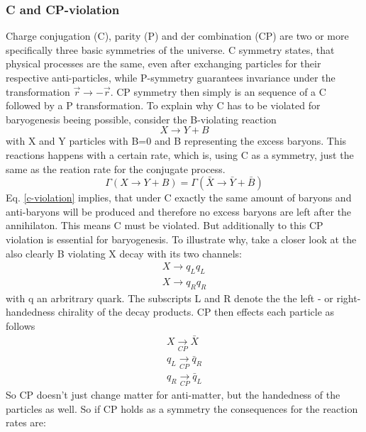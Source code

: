 \subsubsection{C and CP-violation}
Charge conjugation (C), parity (P) and der combination (CP) are two or more specifically three basic symmetries of the universe. C symmetry states, that physical processes are the same, even after exchanging particles for their respective anti-particles, while P-symmetry guarantees invariance under the transformation $\vec{r}\rightarrow-\vec{r}$. CP symmetry then simply is an sequence of a C followed by a P transformation. \newline
To explain why C has to be violated for baryogenesis beeing possible, consider the B-violating reaction
\begin{equation*}
	X\rightarrow Y+B
\end{equation*}
with X and Y particles with B=0 and B representing the excess baryons. This reactions happens with a certain rate, which is, using C as a symmetry, just the same as the reation rate for the conjugate process.
\begin{equation}
	\Gamma(X\rightarrow Y+B)=\Gamma(\bar{X}\rightarrow \bar{Y}+\bar{B})
	\label{c-violation}
\end{equation}
Eq. \ref{c-violation} implies, that under C exactly the same amount of baryons and anti-baryons will be produced and therefore no excess baryons are left after the annihilaton. This means C must be violated. \newline
But additionally to this CP violation is essential for baryogenesis. To illustrate why, take a closer look at the also clearly B  violating X decay with its two channels:
\begin{align*}
	X\rightarrow q_Lq_L\\
	X\rightarrow q_Rq_R
\end{align*}
with q an arbritrary quark. The subscripts L and R denote the the left - or right-handedness chirality of the decay products. CP then effects each particle as follows
\begin{align*}
	X\underset{CP}{\longrightarrow}\bar{X}\\
	q_{L}\underset{CP}{\longrightarrow}\bar{q}_{R}\\
	q_{R}\underset{CP}{\longrightarrow}\bar{q}_{L}
\end{align*}
So CP doesn't just change matter for anti-matter, but the handedness of the particles as well. So if CP holds as a symmetry the consequences for the reaction rates are:

